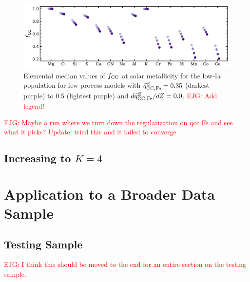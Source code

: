 \documentclass[modern]{aastex631}
\newcommand{\qccFe}{\vec{q}_{{\rm CC, Fe}}^{Z}}
\newcommand{\dqccFe}{d\vec{q}_{{\rm CC, Fe}}^{Z}/dZ}
\newcommand{\fcc}{f_{\rm CC}}
\newcommand{\ejg}[1]{\textcolor{red}{EJG: #1}}
\begin{document}
\begin{figure}[htb!]
    \centering
    \includegraphics[width=\textwidth]{Paper/Figures/qccFe_fcc.pdf}
    \caption{Elemental median values of $\fcc$ at solar metallicity for the low-Ia population for few-process models with $\qccFe=0.35$ (darkest purple) to 0.5 (lightest purple) and $\dqccFe=0.0$. \ejg{Add legend!}}
    \label{fig:qccFe_fcc}
\end{figure}

\ejg{Maybe a run where we turn down the regularization on qcc Fe and see what it picks? Update: tried this and it failed to converge}

\subsection{Increasing to $K=4$} \label{subsec:k=4}

\section{Application to a Broader Data Sample} \label{sec:results_broad}

\subsection{Testing Sample}

\ejg{I think this should be moved to the end for an entire section on the testing sample.}
\end{document}

